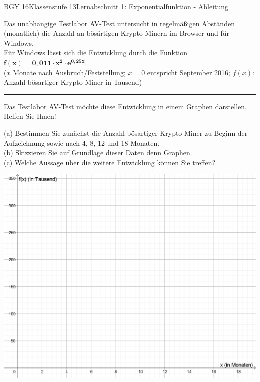 \documentclass[oneside,openany,headings=optiontotoc,11pt,numbers=noenddot]{scrreprt}
\begin{document}
	\begin{worksheet}{BGY 16}{Klassenstufe 13}{Lernabschnitt 1: Exponentialfunktion - Ableitung}
				
		\noindent
		\sffamily
		\begin{framed}
			\noindent
			Das unabhängige Testlabor AV-Test untersucht in regelmäßigen Abständen (monatlich) die Anzahl an bösärtigen Krypto-Minern im Browser und für Windows.\\
			Für Windows lässt sich die Entwicklung durch die Funktion \(\mathbf{f(x) = 0,011\cdot{}x^2\cdot{}e^{0,25x}}\).\\
			(\(x\) Monate nach Ausbruch/Feststellung; \( x = 0\) entspricht September 2016; \(f(x)\): Anzahl bösartiger Krypto-Miner in Tausend)\\
			\rule{\textwidth}{0.1pt}
			\noindent
			Das Testlabor AV-Test möchte diese Entwicklung in einem Graphen darstellen.\\
			Helfen Sie Ihnen!\\
			\par\noindent
			(a) Bestimmen Sie zunächst die Anzahl bösartiger Krypto-Miner zu Beginn der Aufzeichnung sowie nach 4, 8, 12 und 18 Monaten.\\
			(b) Skizzieren Sie auf Grundlage dieser Daten denn Graphen.\\
			(c) Welche Aussage über die weitere Entwicklung können Sie treffen?
		\end{framed}
		\begin{framed}
			\noindent
			\par\noindent
			\includegraphics[width=\textwidth]{../99_Bilder/KoordLeer.png}

\end{framed}
\end{worksheet}
\end{document}
